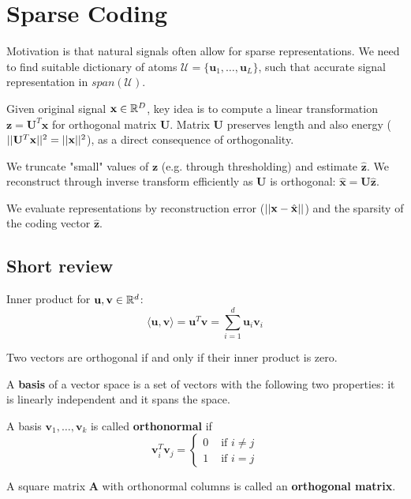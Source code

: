 \documentclass[12pt]{article}
\begin{document}
\section{Sparse Coding}
\par Motivation is that natural signals often allow for sparse representations. We need to find suitable dictionary of atoms $\mathcal{U} = \{ \mathbf{u}_1, \dots , \mathbf{u}_L \}$, such that accurate signal representation in $span (\mathcal{U})$.
\par Given original signal $\mathbf{x}\in \mathbb{R}^D$, key idea is to compute a linear transformation $\mathbf{z} = \mathbf{U}^T \mathbf{x}$ for orthogonal matrix $\mathbf{U}$. Matrix $\mathbf{U}$ preserves length and also energy ($||\mathbf{U}^T \mathbf{x}||^2 = ||\mathbf{x}||^2$), as a direct consequence of orthogonality.
\par We truncate "small" values of $\mathbf{z}$ (e.g. through thresholding) and estimate $\hat{\mathbf{z}}$. We reconstruct through inverse transform efficiently as $\mathbf{U}$ is orthogonal: $\hat{\mathbf{x}} = \mathbf{U}\hat{\mathbf{z}}$.
\par We evaluate representations by reconstruction error ($||\mathbf{x} - \hat{\mathbf{x}}||$) and the sparsity of the coding vector $\hat{\mathbf{z}}$.

\subsection{Short review}
\ulb
\item Inner product for $\mathbf{u}, \mathbf{v} \in \mathbb{R}^d$:
\[ \langle \mathbf{u}, \mathbf{v} \rangle = \mathbf{u}^T \mathbf{v} = \sum_{i=1}^d \mathbf{u}_i \mathbf{v}_i \]
\item Two vectors are orthogonal if and only if their inner product is zero.
\item A \textbf{basis} of a vector space is a set of vectors with the following two properties: it is linearly independent and it spans the space.
\item A basis $\mathbf{v}_1, \dots , \mathbf{v}_k$ is called \textbf{orthonormal} if
\[
\mathbf{v}_i^T \mathbf{v}_j = 
\begin{cases}
0 & \text{ if } i\neq j \\
1 & \text{ if } i = j
\end{cases}
\]
\item A square matrix $\mathbf{A}$ with orthonormal columns is called an \textbf{orthogonal matrix}.
\ule
\end{document}
